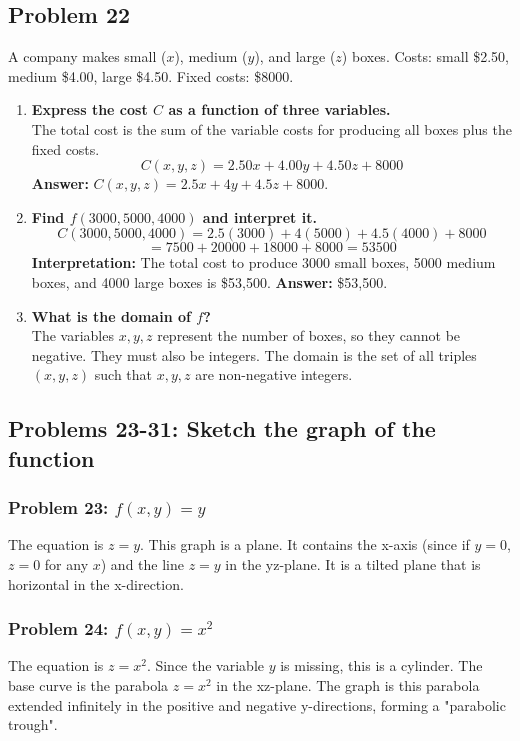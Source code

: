\documentclass{article}
\begin{document}
\subsection{Problem 22}
A company makes small ($x$), medium ($y$), and large ($z$) boxes. Costs: small \$2.50, medium \$4.00, large \$4.50. Fixed costs: \$8000.
\begin{enumerate}[label=\alph*.]
    \item \textbf{Express the cost $C$ as a function of three variables.} \\
    The total cost is the sum of the variable costs for producing all boxes plus the fixed costs.
    \[ C(x, y, z) = 2.50x + 4.00y + 4.50z + 8000 \]
    \textbf{Answer:} $C(x, y, z) = 2.5x + 4y + 4.5z + 8000$.
    \item \textbf{Find $f(3000, 5000, 4000)$ and interpret it.} \\
    \[ C(3000, 5000, 4000) = 2.5(3000) + 4(5000) + 4.5(4000) + 8000 \]
    \[ = 7500 + 20000 + 18000 + 8000 = 53500 \]
    \textbf{Interpretation:} The total cost to produce 3000 small boxes, 5000 medium boxes, and 4000 large boxes is \$53,500.
    \textbf{Answer:} \$53,500.
    \item \textbf{What is the domain of $f$?} \\
    The variables $x, y, z$ represent the number of boxes, so they cannot be negative. They must also be integers.
    The domain is the set of all triples $(x, y, z)$ such that $x, y, z$ are non-negative integers.
\end{enumerate}

\subsection{Problems 23-31: Sketch the graph of the function}

\subsubsection{Problem 23: $f(x, y) = y$}
The equation is $z=y$. This graph is a plane. It contains the x-axis (since if $y=0$, $z=0$ for any $x$) and the line $z=y$ in the yz-plane. It is a tilted plane that is horizontal in the x-direction.

\subsubsection{Problem 24: $f(x, y) = x^2$}
The equation is $z = x^2$. Since the variable $y$ is missing, this is a cylinder. The base curve is the parabola $z=x^2$ in the xz-plane. The graph is this parabola extended infinitely in the positive and negative y-directions, forming a "parabolic trough".
\end{document}
